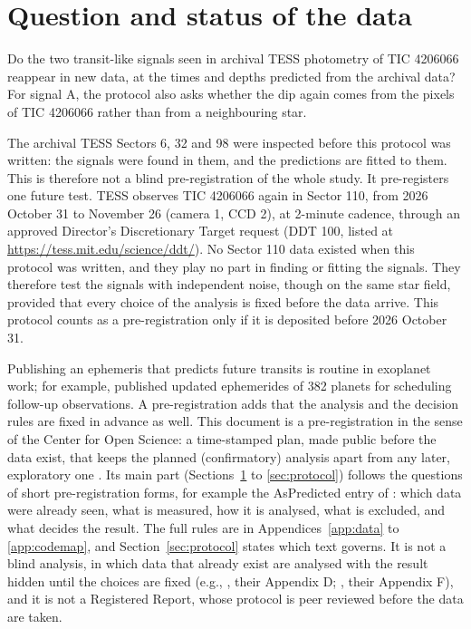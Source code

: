 \section{Question and status of the data} \label{sec:question}

 Do the two transit-like signals seen in archival TESS \citep{Ricker2015} photometry of TIC 4206066
reappear in new data, at the times and depths predicted from the archival data? For signal A, the protocol also asks
whether the dip again comes from the pixels of TIC 4206066 rather than from a neighbouring star.

 The archival TESS Sectors 6, 32 and 98 were inspected before this protocol was written:
the signals were found in them, and the predictions are fitted to them. This is therefore not a blind pre-registration
of the whole study. It pre-registers one future test. TESS observes TIC 4206066 again in Sector 110, from 2026 October
31 to November 26 (camera 1, CCD 2), at 2-minute cadence, through an approved Director's Discretionary Target request
(DDT 100, listed at \url{https://tess.mit.edu/science/ddt/}). No Sector 110 data existed when this protocol was
written, and they play no part in finding or fitting the signals. They therefore test the signals with independent
noise, though on the same star field, provided that every choice of the analysis is fixed before the data arrive.
This protocol counts as a pre-registration only if it is deposited before 2026 October 31.

 Publishing an ephemeris that predicts future transits is routine in exoplanet
work; for example, \citet{IvshinaWinn2022} published updated ephemerides of 382 planets for scheduling follow-up
observations. A pre-registration adds that the analysis and the decision rules are fixed in advance as well. This
document is a pre-registration in the sense of the Center for Open Science: a time-stamped plan, made public before the
data exist, that keeps the planned (confirmatory) analysis apart from any later, exploratory one
. Its main part (Sections~\ref{sec:question} to \ref{sec:protocol}) follows the questions of
short pre-registration forms, for example the AsPredicted entry of \citet{AsPredicted13289}: which data were already
seen, what is measured, how it is analysed, what is excluded, and what decides the result. The full rules are in
Appendices~\ref{app:data} to \ref{app:codemap}, and Section~\ref{sec:protocol} states which text governs. It is not a
blind analysis, in which data that already exist are analysed with the result hidden until the choices are fixed
(e.g., , their Appendix D; \citealt{Asgari2021}, their Appendix F), and it is not a Registered
Report, whose protocol is peer reviewed before the data are taken.
